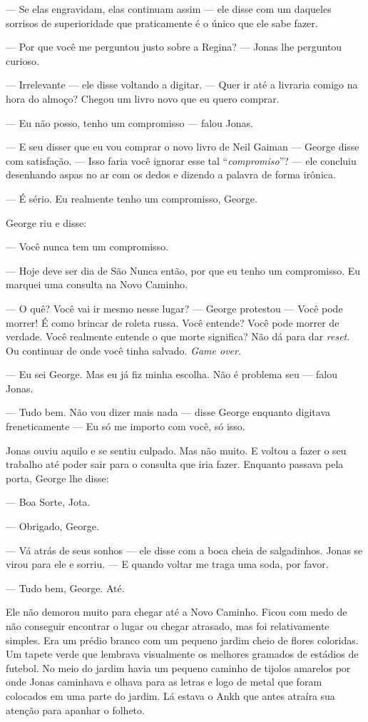 --- Se elas engravidam, elas continuam assim --- ele disse\mudanca{,} com um daqueles sorrisos de superioridade\mudanca{,} que praticamente é o único que ele sabe fazer.

--- Por que você me perguntou justo sobre a Regina? --- Jonas lhe perguntou curioso.

--- Irrelevante --- ele disse voltando a digitar. --- Quer ir até a livraria comigo na hora do almoço? Chegou um livro novo que eu quero comprar.

--- Eu não posso, tenho um compromisso --- falou Jonas.

--- E seu disser que eu vou comprar o novo livro de Neil Gaiman --- George disse com satisfação. --- Isso faria você ignorar esse tal ``\emph{compromiso}''? --- ele concluiu\mudanca{,} desenhando  aspas no ar com os dedos e dizendo a palavra de forma irônica.

--- É sério. Eu realmente tenho um compromisso, George.

George riu e disse:

--- Você nunca tem um compromisso.

--- Hoje deve ser dia de São Nunca então, por que eu tenho um compromisso. Eu marquei uma consulta na Novo Caminho.

--- O quê? Você vai ir mesmo nesse lugar? --- George protestou --- Você pode morrer! É como brincar de roleta russa. Você entende? Você pode morrer de verdade. Você realmente entende o que morte significa? Não dá para dar \emph{reset}. Ou continuar de onde você tinha salvado. \emph{Game over}.

--- Eu sei George. Mas eu já fiz minha escolha. Não é problema seu --- falou Jonas.

--- Tudo bem. Não vou dizer mais nada --- disse George enquanto digitava freneticamente --- Eu só me importo com você, só isso.

Jonas ouviu aquilo e se sentiu culpado. Mas não muito. E voltou a fazer o seu trabalho até poder sair para o consulta que iria fazer. Enquanto passava pela porta, George lhe disse:

--- Boa Sorte, Jota.

--- Obrigado, George.

--- Vá atrás de seus sonhos --- ele disse com a boca cheia de salgadinhos. Jonas se virou para ele e sorriu. --- E quando voltar me traga uma soda, por favor.

--- Tudo bem, George. Até.

Ele não demorou muito para chegar até a Novo Caminho. Ficou com medo de não conseguir encontrar o lugar ou chegar atrasado, mas foi relativamente simples. Era um prédio branco com um pequeno jardim cheio de flores coloridas. Um tapete verde que lembrava visualmente os melhores gramados de estádios de futebol. No meio do jardim havia um pequeno caminho de tijolos amarelos por onde Jonas caminhava e olhava para as letras e logo de metal que foram colocados em uma parte do jardim. Lá estava o Ankh que antes atraíra sua atenção para apanhar o folheto.

